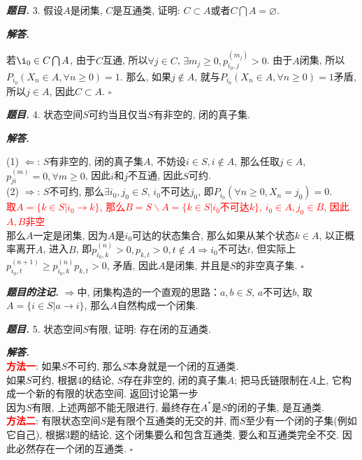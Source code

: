 \documentclass[10pt, a4paper, oneside]{ctexart}
\newenvironment{problem}{\begin{framed}\par\noindent\textbf{\textit{题目. }}}{\end{framed}\par}
\newenvironment{solution}{%
  \par\noindent\textbf{\textit{解答. }}\ignorespaces
}{%
  \hfill\ensuremath{\square}\par %
}
\newenvironment{note}{\par\noindent\textbf{\textit{题目的注记. }}\ignorespaces}{\par}
\begin{document}
\begin{problem}
    3. 假设$A$是闭集, $C$是互通类, 证明: $C\subset A$或者$C\bigcap A=\varnothing$.
\end{problem}
\begin{solution}
若$\i_0\in C\bigcap A$, 由于$C$互通, 所以$\forall j\in C$, $\exists m_j\geq 0, p_{i_0,j}^{(m_j)}>0$. 由于$A$闭集, 所以$P_{i_0}(X_n\in A,\forall n\geq 0)=1$. 那么, 如果$j\notin A$, 就与$P_{i_0}(X_n\in A,\forall n\geq 0)=1$矛盾, 所以$j\in A$, 因此$C\subset A$.
\end{solution}

\begin{problem}
    4. 状态空间$S$可约当且仅当$S$有非空的, 闭的真子集.
\end{problem}
\begin{solution}
(1) $\Leftarrow$: $S$有非空的, 闭的真子集$A$, 不妨设$i\in S,i\notin A$, 那么任取$j\in A$, $p_{ji}^{(m)}=0,\forall m\geq 0$, 因此$i$和$j$不互通, 因此$S$可约.\\
(2) $\Rightarrow$: $S$不可约, 那么$\exists i_0,j_0\in S$, $i_0$不可达$j_0$, 即$P_{i_0}(\forall n\geq 0, X_n=j_0)=0$.\\ \textcolor{red}{取$A=\{k\in S|i_0\to k\}$, 那么$B=S\backslash A=\{k\in S|i_0\text{不可达} k\}$, $i_0\in A, j_0\in B$, 因此$A,B$非空}\\
那么$A$一定是闭集, 因为$A$是$i_0$可达的状态集合, 那么如果从某个状态$k\in A$, 以正概率离开$A$, 进入$B$, 即$p_{i_0,k}^{(n)}>0, p_{k,t}>0,t\notin A\Rightarrow i_0$不可达$t$, 但实际上$p_{i_0,t}^{(n+1)}\geq p_{i_0,k}^{(n)}p_{k,t}>0 $, 矛盾, 因此$A$是闭集, 并且是$S$的非空真子集. 
\end{solution}
\begin{note}
$\Rightarrow$中, 闭集构造的一个直观的思路：$a,b\in S$, $a$不可达$b$, 取$A=\{i\in S| a\to i\}$, 那么$A$自然构成一个闭集.
\end{note}

\begin{problem}
    5. 状态空间$S$有限, 证明: 存在闭的互通类.
\end{problem}
\begin{solution}\\
\textcolor{red}{\textbf{方法一}}: 如果$S$不可约, 那么$S$本身就是一个闭的互通类.\\
如果$S$可约, 根据4的结论, $S$存在非空的, 闭的真子集$A$; 把马氏链限制在$A$上, 它构成一个新的有限的状态空间. 返回讨论第一步\\
因为$S$有限, 上述两部不能无限进行, 最终存在$A^*$是$S$的闭的子集, 是互通类.\\
\textcolor{red}{\textbf{方法二}}: 有限状态空间$S$是有限个互通类的无交的并, 而$S$至少有一个闭的子集(例如它自己), 根据3题的结论, 这个闭集要么和包含互通类, 要么和互通类完全不交. 因此必然存在一个闭的互通类.
\end{solution}
\end{document}
